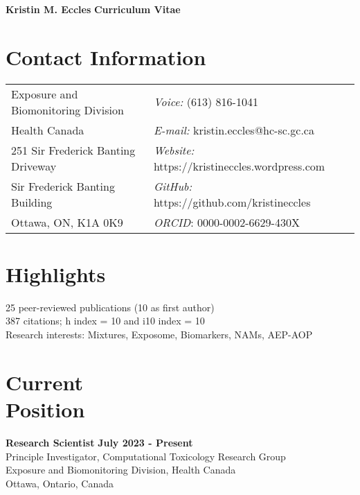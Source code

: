 \documentclass[margin,line]{res}
\begin{document}
\begin{flushleft}
		\huge \textbf{Kristin M. Eccles}
		\hfill {\LARGE \textbf{Curriculum Vitae}}\\
\end{flushleft}

\begin{resume}

\section{\sc Contact Information}
\vspace{.05in}
\begin{tabular}{@{}p{3.2in}p{2.5in}}
Exposure and Biomonitoring Division & {\it Voice:}  (613) 816-1041 \\
Health Canada & {\it E-mail:}  kristin.eccles@hc-sc.gc.ca\\
251 Sir Frederick Banting Driveway&{\it Website:} https://kristineccles.wordpress.com  \\
Sir Frederick Banting Building&{\it GitHub:} https://github.com/kristineccles \\
Ottawa, ON, K1A 0K9 & {\it ORCID}: 0000-0002-6629-430X

\end{tabular}

\vspace*{.1in}
\section{\sc Highlights}
25 peer-reviewed publications (10 as first author)
\\
387 citations; h index = 10 and i10 index = 10
\\
Research interests: Mixtures, Exposome, Biomarkers, NAMs, AEP-AOP

\vspace*{.1in}
\section{\sc Current\\Position}
{\bf  Research Scientist} \hfill {\bf July 2023 - Present}\\
Principle Investigator, Computational Toxicology Research Group\\
Exposure and Biomonitoring Division, Health Canada\\
Ottawa, Ontario, Canada

\vspace*{.1in}

\end{resume}
\end{document}
